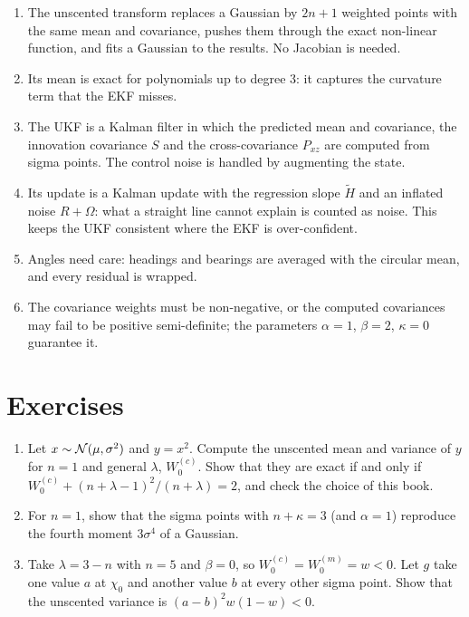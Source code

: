 \begin{enumerate}[nosep]
  \item The unscented transform replaces a Gaussian by $2n+1$ weighted
    points with the same mean and covariance, pushes them through the
    exact non-linear function, and fits a Gaussian to the results. No
    Jacobian is needed.
  \item Its mean is exact for polynomials up to degree $3$: it captures
    the curvature term that the EKF misses.
  \item The UKF is a Kalman filter in which the predicted mean and
    covariance, the innovation covariance $S$ and the cross-covariance
    $P_{xz}$ are computed from sigma points. The control noise is handled
    by augmenting the state.
  \item Its update is a Kalman update with the regression slope $\tilde H$
    and an inflated noise $R+\Omega$: what a straight line cannot explain
    is counted as noise. This keeps the UKF consistent where the EKF is
    over-confident.
  \item Angles need care: headings and bearings are averaged with the
    circular mean, and every residual is wrapped.
  \item The covariance weights must be non-negative, or the computed
    covariances may fail to be positive semi-definite; the parameters
    $\alpha=1$, $\beta=2$, $\kappa=0$ guarantee it.
\end{enumerate}

\FloatBarrier
\section*{Exercises}

\begin{enumerate}[label=\textbf{5.\arabic*},ref=5.\arabic*]
\item\label{ex:square} Let $x\sim\mathcal{N}(\mu,\sigma^2)$ and $y=x^2$.
  Compute the unscented mean and variance of $y$ for $n=1$ and general
  $\lambda$, $W^{(c)}_0$. Show that they are exact if and only if
  $W^{(c)}_0+(n+\lambda-1)^2/(n+\lambda)=2$, and check the choice of this
  book.
\item\label{ex:kurtosis} For $n=1$, show that the sigma points with
  $n+\kappa=3$ (and $\alpha=1$) reproduce the fourth moment $3\sigma^4$ of
  a Gaussian.
\item\label{ex:negative} Take $\lambda=3-n$ with $n=5$ and $\beta=0$, so
  $W^{(c)}_0=W^{(m)}_0=w<0$. Let $g$ take one value $a$ at $\chi_0$ and
  another value $b$ at every other sigma point. Show that the unscented
  variance is $(a-b)^2w(1-w)<0$.
\end{enumerate}

